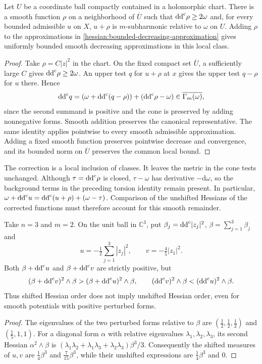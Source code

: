 \begin{lemma}\label{hessian:local-unshifted-correction}
Let $U$ be a coordinate ball compactly contained in a holomorphic
chart. There is a smooth function $\rho$ on a
neighborhood of $\overline U$ such that $\mathrm{dd}^{\mathrm{c}}\rho\geq2\omega$ and,
for every bounded admissible $u$ on $X$, $u+\rho$ is $m$-subharmonic
relative to $\omega$ on $U$. Adding $\rho$ to the approximations in
\cref{hessian:bounded-decreasing-approximation} gives uniformly bounded
smooth decreasing approximations in this local class.
\end{lemma}
\begin{proof}
Take $\rho=C|z|^2$ in the chart. On the fixed compact set $\overline U$,
a sufficiently large $C$ gives $\mathrm{dd}^{\mathrm{c}}\rho\geq2\omega$. An upper test
$q$ for $u+\rho$ at $x$ gives the upper test $q-\rho$ for $u$ there.
Hence
\[
 \mathrm{dd}^{\mathrm{c}} q=(\omega+\mathrm{dd}^{\mathrm{c}}(q-\rho))+(\mathrm{dd}^{\mathrm{c}}\rho-\omega)
                 \in\overline{\Gamma_m(\omega)},
\]
since the second summand is positive and the cone is preserved by
adding nonnegative forms. Smooth addition preserves the canonical
representative. The same identity applies pointwise to every smooth
admissible approximation. Adding a fixed smooth function preserves
pointwise decrease and convergence, and its bounded norm on
$\overline U$ preserves the common local bound.
\end{proof}

The correction is a local inclusion of classes. It leaves the metric
in the cone tests unchanged. Although $\tau=\mathrm{dd}^{\mathrm{c}}\rho$ is closed,
$\tau-\omega$ has derivative $-\mathrm d\omega$, so the background
terms in the preceding torsion identity remain present.
In particular,
$\omega+\mathrm{dd}^{\mathrm{c}} u=\mathrm{dd}^{\mathrm{c}}(u+\rho)+(\omega-\tau)$.
Comparison of the unshifted Hessians of the corrected functions
must therefore account for this smooth remainder.

\begin{example}\label{hessian:shifted-unshifted-order}
Take $n=3$ and $m=2$. On the unit ball in $\mathbb C^3$, put
$\beta_j=\mathrm{dd}^{\mathrm{c}}|z_j|^2$, $\beta=\sum_{j=1}^3\beta_j$ and
\[
 u=-\tfrac12\sum_{j=1}^3|z_j|^2,
 \qquad v=-\tfrac45|z_1|^2.
\]
Both $\beta+\mathrm{dd}^{\mathrm{c}} u$ and $\beta+\mathrm{dd}^{\mathrm{c}} v$ are strictly positive, but
\[
 (\beta+\mathrm{dd}^{\mathrm{c}} v)^2\wedge\beta>
 (\beta+\mathrm{dd}^{\mathrm{c}} u)^2\wedge\beta,
 \qquad
 (\mathrm{dd}^{\mathrm{c}} v)^2\wedge\beta<(\mathrm{dd}^{\mathrm{c}} u)^2\wedge\beta.
\]
Thus shifted Hessian order does not imply unshifted Hessian order,
even for smooth potentials with positive perturbed forms.
\end{example}
\begin{proof}
The eigenvalues of the two perturbed forms relative to $\beta$ are
$(\tfrac12,\tfrac12,\tfrac12)$ and $(\tfrac15,1,1)$.
For a diagonal form $\alpha$ with relative eigenvalues $\lambda_1,\lambda_2,
\lambda_3$, its second Hessian $\alpha^2\wedge\beta$ is
$(\lambda_1\lambda_2+\lambda_1\lambda_3+\lambda_2\lambda_3)\beta^3/3$.
Consequently the shifted measures of $u,v$ are
$\tfrac14\beta^3$ and $\tfrac7{15}\beta^3$, while their unshifted
expressions are $\tfrac14\beta^3$ and $0$.
\end{proof}


